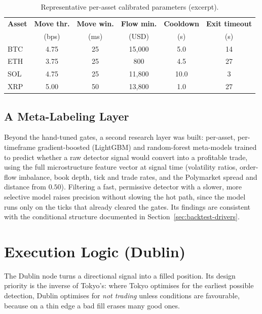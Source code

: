 \documentclass{tmsce}
\let\oldsection\section
\renewcommand{\section}{\clearpage\oldsection}
\begin{document}
\renewcommand{\arraystretch}{1.2}
\begin{table}[H]
  \centering
  \caption{Representative per-asset calibrated parameters (excerpt).}
  \label{tab:calib}
  \begin{tabular}{lccccc}
    \toprule
    \textbf{Asset} & \textbf{Move thr.} & \textbf{Move win.} & \textbf{Flow min.}
      & \textbf{Cooldown} & \textbf{Exit timeout} \\
     & (bps) & (ms) & (USD) & (s) & (s) \\
    \midrule
    BTC & 4.75 & 25 & 15{,}000 & 5.0  & 14 \\
    ETH & 3.75 & 25 & 800      & 4.5  & 27 \\
    SOL & 4.75 & 25 & 11{,}800 & 10.0 & 3  \\
    XRP & 5.00 & 50 & 13{,}800 & 1.0  & 27 \\
    \bottomrule
  \end{tabular}
\end{table}

\subsection{A Meta-Labeling Layer}

Beyond the hand-tuned gates, a second research layer was built: per-asset,
per-timeframe gradient-boosted (LightGBM) and random-forest meta-models trained to
predict whether a raw detector signal would convert into a profitable trade, using
the full microstructure feature vector at signal time (volatility ratios, order-flow
imbalance, book depth, tick and trade rates, and the Polymarket spread and distance
from $0.50$). Filtering a fast, permissive detector with a slower, more selective
model raises precision without slowing the hot path, since the model runs only on the
ticks that already cleared the gates. Its findings are consistent with the
conditional structure documented in Section~\ref{sec:backtest-drivers}.


\section{Execution Logic (Dublin)}
\label{sec:execution}

The Dublin node turns a directional signal into a filled position. Its design
priority is the inverse of Tokyo's: where Tokyo optimises for the earliest possible
detection, Dublin optimises for \emph{not trading} unless conditions are favourable,
because on a thin edge a bad fill erases many good ones.
\end{document}

